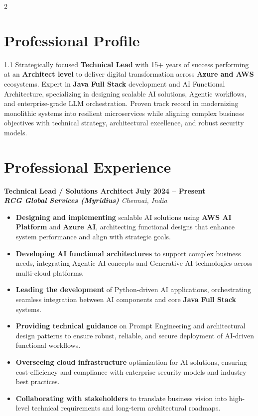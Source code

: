 \documentclass[10pt,a4paper]{article}
\newcommand{\job}[4]{
    \vspace{4pt} 
    \noindent
    {\small\bfseries\color{textgray} #1} \hfill {\footnotesize\bfseries #2} \\[1pt]
    {\scriptsize\textbf{\textit{\color{headerblue} #3}}} \hfill {\scriptsize\textit{#4}}
}
\begin{document}
\begin{paracol}{2}


\section*{\faUser \hspace{4pt} Professional Profile}
\begin{spacing}{1.1} 
\scriptsize
Strategically focused \textbf{Technical Lead} with 15+ years of success performing at an \textbf{Architect level} to deliver digital transformation across \textbf{Azure and AWS} ecosystems. Expert in \textbf{Java Full Stack} development and AI Functional Architecture, specializing in designing scalable AI solutions, Agentic workflows, and enterprise-grade LLM orchestration. Proven track record in modernizing monolithic systems into resilient microservices while aligning complex business objectives with technical strategy, architectural excellence, and robust security models.
\end{spacing}

\section*{\faBriefcase \hspace{4pt} Professional Experience}

\scriptsize\job{Technical Lead / Solutions Architect}{July 2024 -- Present}{RCG Global Services (Myridius)}{Chennai, India}
\begin{itemize}
    \item \textbf{Designing and implementing} scalable AI solutions using \textbf{AWS AI Platform} and \textbf{Azure AI}, architecting functional designs that enhance system performance and align with strategic goals.
    \item \textbf{Developing AI functional architectures} to support complex business needs, integrating Agentic AI concepts and Generative AI technologies across multi-cloud platforms.
    \item \textbf{Leading the development} of Python-driven AI applications, orchestrating seamless integration between AI components and core \textbf{Java Full Stack} systems.
    \item \textbf{Providing technical guidance} on Prompt Engineering and architectural design patterns to ensure robust, reliable, and secure deployment of AI-driven functional workflows.
    \item \textbf{Overseeing cloud infrastructure} optimization for AI solutions, ensuring cost-efficiency and compliance with enterprise security models and industry best practices.
    \item \textbf{Collaborating with stakeholders} to translate business vision into high-level technical requirements and long-term architectural roadmaps.
\end{itemize}


\end{paracol}
\end{document}
